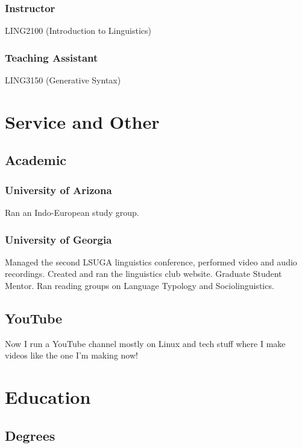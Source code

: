 \documentclass{article}
\begin{document}
\subsubsection{Instructor}

LING2100 (Introduction to Linguistics)

\subsubsection{Teaching Assistant}

LING3150 (Generative Syntax)

\section{Service and Other}

\subsection{Academic}

\subsubsection{University of Arizona}

Ran an Indo-European study group.

\subsubsection{University of Georgia}

Managed the second LSUGA linguistics conference, performed video and audio recordings. Created and ran the linguistics club website. Graduate Student Mentor. Ran reading groups on Language Typology and Sociolinguistics.

\subsection{YouTube}

Now I run a YouTube channel mostly on Linux and tech stuff where I make videos like the one I'm making now!

\section{Education}

\subsection{Degrees}
\end{document}
